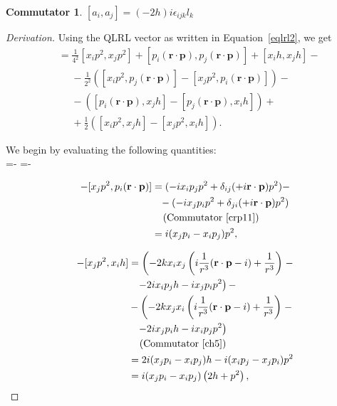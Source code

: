 \documentclass[12pt,a4paper]{report}
\theoremstyle{definition}
\newtheorem{commutator}{Commutator}[section]
\newenvironment{derivation}
  {\renewcommand\qedsymbol{$\square$}\begin{proof}[Derivation]}
  {\end{proof}}
\theoremstyle{remark}
\theoremstyle{remark}
\begin{document}
\begin{appendices}
\begin{commutator}\label{ca2}
$[a_i,a_j]=\left(-2h\right)i\epsilon_{ijk}l_k$
\end{commutator}
\begin{derivation}
Using the QLRL vector as written in Equation~\ref{eqlrl2}, we get
\begin{align*}
[a_i,a_j] &= \frac{1}{4^2}[x_ip^2,x_jp^2]+[p_i(\textbf{r}\cdot\textbf{p}),p_j(\textbf{r}\cdot\textbf{p})]+[x_ih,x_jh]- \\ 
&\phantom{=} -\frac{1}{2^2}([x_ip^2,p_j(\textbf{r}\cdot\textbf{p})]-[x_jp^2,p_i(\textbf{r}\cdot\textbf{p})])-\\ 
&\phantom{=}-([p_i(\textbf{r}\cdot\textbf{p}),x_jh]-[p_j(\textbf{r}\cdot\textbf{p}),x_ih])+ \\
&\phantom{=}+\frac{1}{2}([x_ip^2,x_jh]-[x_jp^2,x_ih]).
\end{align*}

We begin by evaluating the following quantities: \\

\abovedisplayskip=-\baselineskip
\belowdisplayskip=10pt
\abovedisplayshortskip=-\baselineskip
\belowdisplayshortskip=0pt

\begin{align*}
[x_ip^2,p_j(\textbf{r}\cdot\textbf{p})]-[x_jp^2,p_i(\textbf{r}\cdot\textbf{p})] &= (-i x_ip_jp^2+\delta_{ij}(+i\textbf{r}\cdot\textbf{p})p^2) - \\
&\phantom{=}-(-i x_jp_ip^2+\delta_{ji}(+i\textbf{r}\cdot\textbf{p})p^2)\\
&\phantom{=} \text{ (Commutator~\ref{crp11})} \\
&= i(x_jp_i-x_ip_j)p^2,
\end{align*}

\begin{align*}
[x_ip^2,x_jh]-[x_jp^2,x_ih] &= \left(-2kx_ix_j\left(i\frac{1}{r^3}(\textbf{r}\cdot\textbf{p}-i)+\frac{1}{r^3}\right)\right.- \notag\\
&\phantom{=} \left.-2i x_ip_jh-ix_jp_ip^2\right)- \notag\\
&- \left(-2kx_jx_i\left(i\frac{1}{r^3}(\textbf{r}\cdot\textbf{p}-i)+\frac{1}{r^3}\right)\right.- \notag\\
&\phantom{=} \left.-2i x_jp_ih-ix_ip_jp^2\right) \notag\\ 
&\phantom{=} \text{ (Commutator~\ref{ch5})} \\
&=2i(x_jp_i-x_ip_j)h-i(x_ip_j-x_jp_i)p^2 \\
&= i(x_jp_i-x_ip_j)\left(2h+p^2\right),
\end{align*}


\end{derivation}
\end{appendices}
\end{document}
